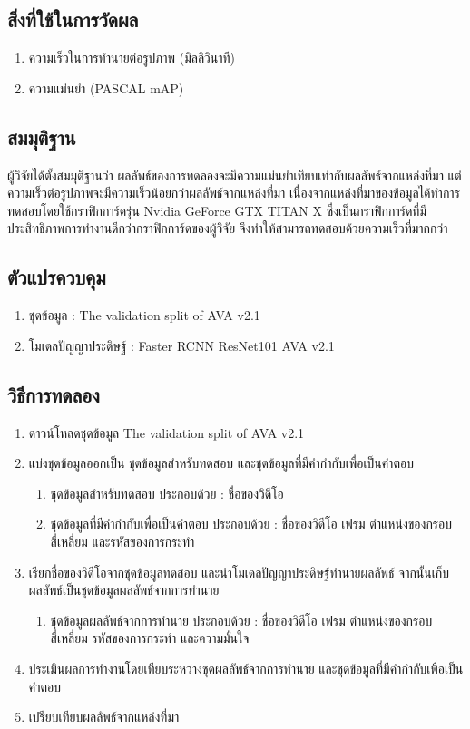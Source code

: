 \subsection*{สิ่งที่ใช้ในการวัดผล}
	\begin{enumerate}
		\item ความเร็วในการทำนายต่อรูปภาพ (มิลลิวินาที)
		\item ความแม่นยำ (PASCAL mAP)
	\end{enumerate}
\subsection*{สมมุติฐาน}
ผู้วิจัยได้ตั้งสมมุติฐานว่า ผลลัพธ์ของการทดลองจะมีความแม่นยำเทียบเท่ากับผลลัพธ์จากแหล่งที่มา แต่ความเร็วต่อรูปภาพจะมีความเร็วน้อยกว่าผลลัพธ์จากแหล่งที่มา 
เนื่องจากแหล่งที่มาของข้อมูลได้ทำการทดสอบโดยใช้กราฟิกการ์ดรุ่น Nvidia GeForce GTX TITAN X ซึ่งเป็นกราฟิกการ์ดที่มีประสิทธิภาพการทำงานดีกว่ากราฟิกการ์ดของผู้วิจัย จึงทำให้สามารถทดสอบด้วยความเร็วที่มากกว่า
\subsection*{ตัวแปรควบคุม}
	\begin{enumerate}
		\item ชุดข้อมูล : The validation split of AVA v2.1
		\item โมเดลปัญญาประดิษฐ์ : Faster RCNN ResNet101 AVA v2.1
	\end{enumerate}
\subsection*{วิธีการทดลอง}
	\begin{enumerate}
		\item ดาวน์โหลดชุดข้อมูล The validation split of AVA v2.1
		\item แบ่งชุดข้อมูลออกเป็น ชุดข้อมูลสำหรับทดสอบ และชุดข้อมูลที่มีคำกำกับเพื่อเป็นคำตอบ
			\begin{enumerate}
				\item ชุดข้อมูลสำหรับทดสอบ ประกอบด้วย : ชื่อของวิดีโอ
				\item ชุดข้อมูลที่มีคำกำกับเพื่อเป็นคำตอบ ประกอบด้วย : ชื่อของวิดีโอ เฟรม ตำแหน่งของกรอบสี่เหลี่ยม และรหัสของการกระทำ
			\end{enumerate}
		\item เรียกชื่อของวิดีโอจากชุดข้อมูลทดสอบ และนำโมเดลปัญญาประดิษฐ์ทำนายผลลัพธ์ จากนั้นเก็บผลลัพธ์เป็นชุดข้อมูลผลลัพธ์จากการทำนาย
			\begin{enumerate}
				\item ชุดข้อมูลผลลัพธ์จากการทำนาย ประกอบด้วย : ชื่อของวิดีโอ เฟรม ตำแหน่งของกรอบสี่เหลี่ยม รหัสของการกระทำ และความมั่นใจ
			\end{enumerate}
		\item ประเมินผลการทำงานโดยเทียบระหว่างชุดผลลัพธ์จากการทำนาย และชุดข้อมูลที่มีคำกำกับเพื่อเป็นคำตอบ
		\item เปรียบเทียบผลลัพธ์จากแหล่งที่มา
\end{enumerate}
\clearpage
